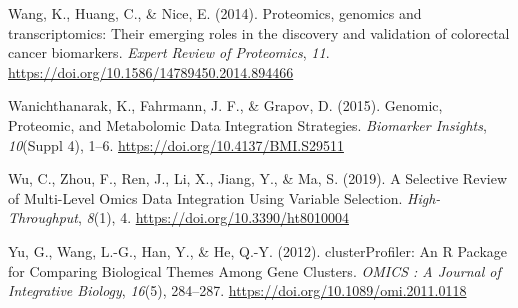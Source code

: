 \documentclass[a4paper, nobind]{templates/ociamthesis}
\newlength{\cslhangindent}
\newenvironment{CSLReferences}[2] %
 {%
  \setlength{\parindent}{0pt}
  \ifodd #1
  \let\oldpar\par
  \def\par{\hangindent=\cslhangindent\oldpar}
  \fi
  \setlength{\parskip}{1mm}
  \setlength{\baselineskip}{6mm}
 }%
 {}
\begin{document}
\begin{CSLReferences}{1}{0}
\leavevmode{}%
Wang, K., Huang, C., \& Nice, E. (2014). Proteomics, genomics and transcriptomics: {Their} emerging roles in the discovery and validation of colorectal cancer biomarkers. \emph{Expert Review of Proteomics}, \emph{11}. \url{https://doi.org/10.1586/14789450.2014.894466}

\leavevmode{}%
Wanichthanarak, K., Fahrmann, J. F., \& Grapov, D. (2015). Genomic, {Proteomic}, and {Metabolomic} {Data} {Integration} {Strategies}. \emph{Biomarker Insights}, \emph{10}(Suppl 4), 1--6. \url{https://doi.org/10.4137/BMI.S29511}

\leavevmode{}%
Wu, C., Zhou, F., Ren, J., Li, X., Jiang, Y., \& Ma, S. (2019). A {Selective} {Review} of {Multi}-{Level} {Omics} {Data} {Integration} {Using} {Variable} {Selection}. \emph{High-Throughput}, \emph{8}(1), 4. \url{https://doi.org/10.3390/ht8010004}

\leavevmode{}%
Yu, G., Wang, L.-G., Han, Y., \& He, Q.-Y. (2012). {clusterProfiler}: An {R} {Package} for {Comparing} {Biological} {Themes} {Among} {Gene} {Clusters}. \emph{OMICS : A Journal of Integrative Biology}, \emph{16}(5), 284--287. \url{https://doi.org/10.1089/omi.2011.0118}

\end{CSLReferences}

\end{document}
